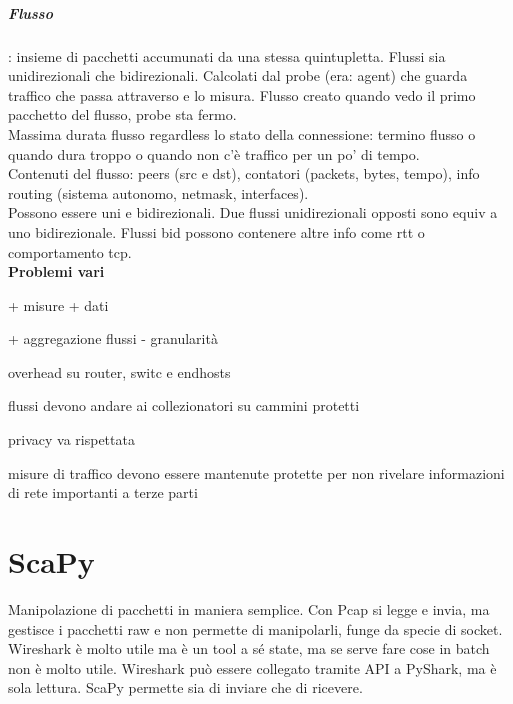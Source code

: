 \documentclass[10pt]{book}
\begin{document}
\paragraph{Flusso}: insieme di pacchetti accumunati da una stessa quintupletta. Flussi sia unidirezionali che bidirezionali. Calcolati dal probe (era: agent) che guarda traffico che passa attraverso e lo misura. Flusso creato quando vedo il primo pacchetto del flusso, probe sta fermo.\\
Massima durata flusso regardless lo stato della connessione: termino flusso o quando dura troppo o quando non c'è traffico per un po' di tempo.\\
Contenuti del flusso: peers (src e dst), contatori (packets, bytes, tempo), info routing (sistema autonomo, netmask, interfaces).\\
Possono essere uni e bidirezionali. Due flussi unidirezionali opposti sono equiv a uno bidirezionale. Flussi bid possono contenere altre info come rtt o comportamento tcp.\\
\textbf{Problemi vari}\\
\begin{list}{}{Overhead vs accuratezza}
	\item + misure + dati
	\item + aggregazione flussi - granularità
	\item overhead su router, switc e endhosts
\end{list}
\begin{list}{}{Security vs data sharing}
	\item flussi devono andare ai collezionatori su cammini protetti
	\item privacy va rispettata
	\item misure di traffico devono essere mantenute protette per non rivelare informazioni di rete importanti a terze parti
\end{list}

\chapter{ScaPy}
Manipolazione di pacchetti in maniera semplice. Con Pcap si legge e invia, ma gestisce i pacchetti raw e non permette di manipolarli, funge da specie di socket. Wireshark è molto utile ma è un tool a sé state, ma se serve fare cose in batch non è molto utile. Wireshark può essere collegato tramite API a PyShark, ma è sola lettura. ScaPy permette sia di inviare che di ricevere.
\end{document}
